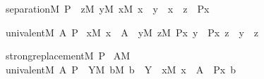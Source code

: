 \begin{isabelle}%
separation{\isacharparenleft}{\kern0pt}M{\isacharcomma}{\kern0pt}\ P{\isacharparenright}{\kern0pt}\ {\isasymequiv}\ {\isasymforall}z{\isacharbrackleft}{\kern0pt}M{\isacharbrackright}{\kern0pt}{\isachardot}{\kern0pt}\ {\isasymexists}y{\isacharbrackleft}{\kern0pt}M{\isacharbrackright}{\kern0pt}{\isachardot}{\kern0pt}\ {\isasymforall}x{\isacharbrackleft}{\kern0pt}M{\isacharbrackright}{\kern0pt}{\isachardot}{\kern0pt}\ x\ {\isasymin}\ y\ {\isasymlongleftrightarrow}\ x\ {\isasymin}\ z\ {\isasymand}\ P{\isacharparenleft}{\kern0pt}x{\isacharparenright}{\kern0pt}%
\end{isabelle}%
\begin{isabelle}%
univalent{\isacharparenleft}{\kern0pt}M{\isacharcomma}{\kern0pt}\ A{\isacharcomma}{\kern0pt}\ P{\isacharparenright}{\kern0pt}\ {\isasymequiv}\isanewline
{\isasymforall}x{\isacharbrackleft}{\kern0pt}M{\isacharbrackright}{\kern0pt}{\isachardot}{\kern0pt}\ x\ {\isasymin}\ A\ {\isasymlongrightarrow}\ {\isacharparenleft}{\kern0pt}{\isasymforall}y{\isacharbrackleft}{\kern0pt}M{\isacharbrackright}{\kern0pt}{\isachardot}{\kern0pt}\ {\isasymforall}z{\isacharbrackleft}{\kern0pt}M{\isacharbrackright}{\kern0pt}{\isachardot}{\kern0pt}\ P{\isacharparenleft}{\kern0pt}x{\isacharcomma}{\kern0pt}\ y{\isacharparenright}{\kern0pt}\ {\isasymand}\ P{\isacharparenleft}{\kern0pt}x{\isacharcomma}{\kern0pt}\ z{\isacharparenright}{\kern0pt}\ {\isasymlongrightarrow}\ y\ {\isacharequal}{\kern0pt}\ z{\isacharparenright}{\kern0pt}%
\end{isabelle}%
\begin{isabelle}%
strong{\isacharunderscore}{\kern0pt}replacement{\isacharparenleft}{\kern0pt}M{\isacharcomma}{\kern0pt}\ P{\isacharparenright}{\kern0pt}\ {\isasymequiv}\isanewline
{\isasymforall}A{\isacharbrackleft}{\kern0pt}M{\isacharbrackright}{\kern0pt}{\isachardot}{\kern0pt}\isanewline
\isaindent{\ \ \ }univalent{\isacharparenleft}{\kern0pt}M{\isacharcomma}{\kern0pt}\ A{\isacharcomma}{\kern0pt}\ P{\isacharparenright}{\kern0pt}\ {\isasymlongrightarrow}\ {\isacharparenleft}{\kern0pt}{\isasymexists}Y{\isacharbrackleft}{\kern0pt}M{\isacharbrackright}{\kern0pt}{\isachardot}{\kern0pt}\ {\isasymforall}b{\isacharbrackleft}{\kern0pt}M{\isacharbrackright}{\kern0pt}{\isachardot}{\kern0pt}\ b\ {\isasymin}\ Y\ {\isasymlongleftrightarrow}\ {\isacharparenleft}{\kern0pt}{\isasymexists}x{\isacharbrackleft}{\kern0pt}M{\isacharbrackright}{\kern0pt}{\isachardot}{\kern0pt}\ x\ {\isasymin}\ A\ {\isasymand}\ P{\isacharparenleft}{\kern0pt}x{\isacharcomma}{\kern0pt}\ b{\isacharparenright}{\kern0pt}{\isacharparenright}{\kern0pt}{\isacharparenright}{\kern0pt}%
\end{isabelle}%
